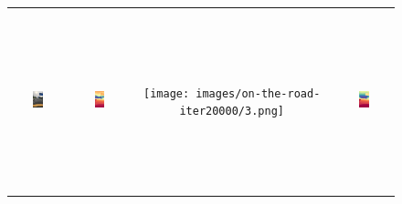 \documentclass{article}
\begin{document}
\begin{figure}[H]
\begin{tabular}{cccc}
    \includegraphics[width=0.2\textwidth,height=5.2cm,keepaspectratio]{images/on-the-road/3.jpg} &
    \includegraphics[width=0.2\textwidth,height=5.2cm,keepaspectratio]{images/real_image_trained/depth_colored/3.png} &
    \texttt{[image: images/on-the-road-iter20000/3.png]} &
    \includegraphics[width=0.2\textwidth,height=5.2cm,keepaspectratio]{images/real_image/depth_colored/3.png} \\


\end{tabular}
\end{figure}
\end{document}
